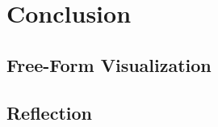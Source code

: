 \documentclass[12pt,a4paper]{article}
\begin{document}
\section{Conclusion}
%
\subsection*{Free-Form Visualization}
%
\subsection*{Reflection}
%
\end{document}
